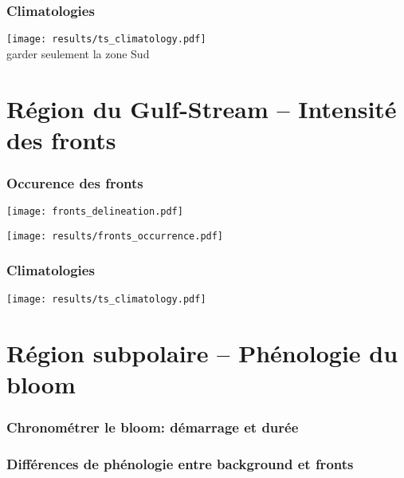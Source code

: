 \documentclass[11pt, french, aspectratio=32]{beamer}
\begin{document}
\begin{frame}
  \frametitle{Climatologies}
  \texttt{[image: results/ts\_climatology.pdf]}
  \\
  garder seulement la zone Sud
\end{frame}


\section{Région du Gulf-Stream -- Intensité des fronts}


\begin{frame}
  \frametitle{Occurence des fronts}
  \texttt{[image: fronts\_delineation.pdf]}
  \\
  \vfill

  \texttt{[image: results/fronts\_occurrence.pdf]}

\end{frame}


\begin{frame}
  \frametitle{Climatologies}
  \texttt{[image: results/ts\_climatology.pdf]}
\end{frame}


\section{Région subpolaire -- Phénologie du bloom}


\begin{frame}
  \frametitle{Chronométrer le bloom: démarrage et durée}
\end{frame}


\begin{frame}
  \frametitle{Différences de phénologie entre background et fronts}
\end{frame}
\end{document}
